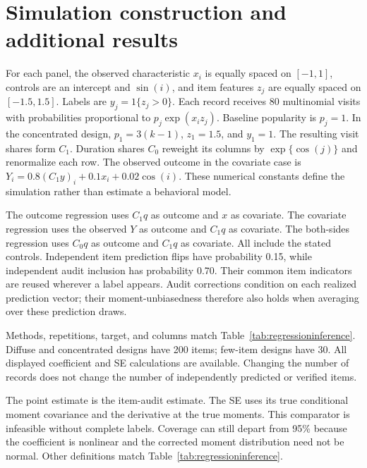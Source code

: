 \section{Simulation construction and additional results}\label{app:simulation}
For each panel, the observed characteristic $x_i$ is equally spaced on
$[-1,1]$, controls are an intercept and $\sin(i)$, and item features $z_j$
are equally spaced on $[-1.5,1.5]$. Labels are $y_j=1\{z_j>0\}$.
Each record receives 80 multinomial visits with probabilities proportional
to $p_j\exp(x_i z_j)$. Baseline popularity is $p_j=1$. In the concentrated
design, $p_1=3(k-1)$, $z_1=1.5$, and $y_1=1$. The resulting visit shares
form $C_1$. Duration shares $C_0$ reweight its columns by $\exp\{\cos(j)\}$
and renormalize each row. The observed outcome in the covariate case is
$Y_i=0.8(C_1y)_i+0.1x_i+0.02\cos(i)$. These numerical constants define
the simulation rather than estimate a behavioral model.

The outcome regression uses $C_1q$ as outcome and $x$ as covariate. The
covariate regression uses the observed $Y$ as outcome and $C_1q$ as
covariate. The both-sides regression uses $C_0q$ as outcome and $C_1q$ as
covariate. All include the stated controls. Independent item prediction
flips have probability 0.15, while independent audit inclusion has
probability 0.70. Their common item indicators are reused wherever a label
appears. Audit corrections condition on each realized prediction vector;
their moment-unbiasedness therefore also holds when averaging over these
prediction draws.

\begin{table}[htbp]
\centering\footnotesize
\caption{The same simulation in panels of 200 records}

\par\smallskip
\begin{minipage}{\linewidth}\footnotesize
Methods, repetitions, target, and columns match Table~\ref{tab:regressioninference}.
Diffuse and concentrated designs have 200 items; few-item designs have 30.
All displayed coefficient and SE calculations are available. Changing the
number of records does not change the number of independently predicted or
verified items.
\end{minipage}
\end{table}
\FloatBarrier

\begin{table}[htbp]
\centering\footnotesize
\caption{Oracle audit delta intervals in panels of 800 records}

\par\smallskip
\begin{minipage}{\linewidth}\footnotesize
The point estimate is the item-audit estimate. The SE uses its true
conditional moment covariance and the derivative at the true moments.
This comparator is infeasible without complete labels. Coverage can still
depart from 95\% because the coefficient is nonlinear and the corrected
moment distribution need not be normal. Other definitions match
Table~\ref{tab:regressioninference}.
\end{minipage}
\end{table}
\FloatBarrier

